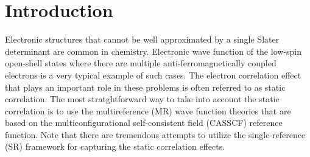 \documentclass[aip,jcp,amsmath,twocolumn,floatfix,reprint,fleqn]{revtex4-1}
\begin{document}
\section{Introduction}
%
Electronic structures that cannot be well approximated by a single Slater determinant are common in chemistry.
%
Electronic wave function of the low-spin open-shell states where there are multiple anti-ferromagnetically coupled electrons is a very typical example of such cases.\cite{NEESE2009526}
%
The electron correlation effect that plays an important role in these problems is often referred to as static correlation.\cite{doi:10.1021/cr2001417}
%
The most stratghtforward way to take into account the static correlation is to use the multireference (MR) wave function theories\cite{MCSCFandMRCI2011,doi:10.1021/cr300500z} that are based on the multiconfigurational self-consistent field (CASSCF) reference function.\cite{roosa1980,Roos1987,ruedenbergmcscf1979}
%
Note that there are tremendous attempts to utilize the single-reference (SR) framework\cite{doi:10.1063/1.481769,doi:10.1063/1.1290609,doi:10.1021/jp056791e,doi:10.1021/acs.jctc.9b00456,doi:10.1063/1.4991020,doi:10.1063/1.5053605,doi:10.1063/1.5085314,doi:10.1021/acs.jpclett.7b00689,PhysRevB.96.155106,doi:10.1021/acs.jpclett.8b01754,doi:10.1021/acs.jctc.6b00137,doi:10.1063/1.5036542,doi:10.1002/jcc.25163} for capturing the static correlation effects.
\end{document}
